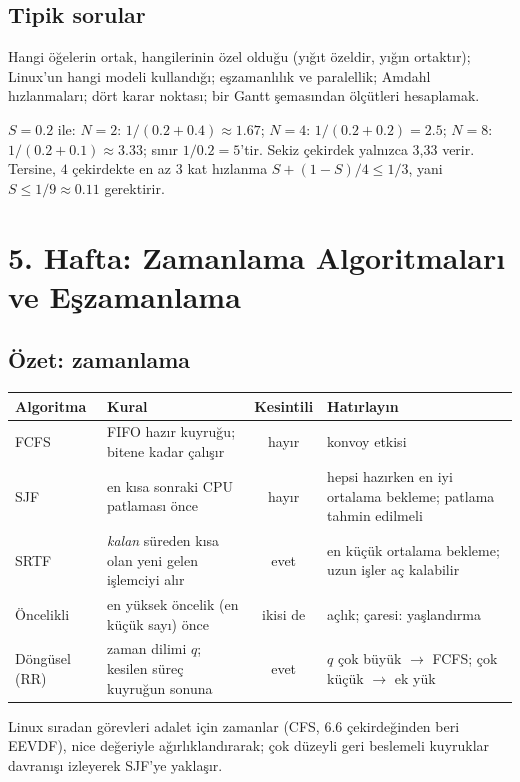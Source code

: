 \documentclass[11pt,a4paper]{article}
\begin{document}
\subsection*{Tipik sorular}
Hangi öğelerin ortak, hangilerinin özel olduğu (yığıt özeldir, yığın ortaktır); Linux'un hangi modeli kullandığı; eşzamanlılık ve paralellik; Amdahl hızlanmaları; dört karar noktası; bir Gantt şemasından ölçütleri hesaplamak.

\begin{example}
$S = 0.2$ ile: $N = 2$: $1/(0.2 + 0.4) \approx 1.67$; $N = 4$: $1/(0.2 + 0.2) = 2.5$; $N = 8$: $1/(0.2 + 0.1) \approx 3.33$; sınır $1/0.2 = 5$'tir. Sekiz çekirdek yalnızca 3,33 verir. Tersine, $4$ çekirdekte en az $3$ kat hızlanma $S + (1-S)/4 \le 1/3$, yani $S \le 1/9 \approx 0.11$ gerektirir.
\end{example}

\section{5. Hafta: Zamanlama Algoritmaları ve Eşzamanlama}
\label{sec:w5}
\subsection*{Özet: zamanlama}
\begin{center}
\renewcommand{\arraystretch}{1.25}
\begin{tabularx}{\linewidth}{@{}l >{\raggedright\arraybackslash}X c >{\raggedright\arraybackslash}X@{}}
\toprule
\textbf{Algoritma} & \textbf{Kural} & \textbf{Kesintili} & \textbf{Hatırlayın} \\
\midrule
FCFS & FIFO hazır kuyruğu; bitene kadar çalışır & hayır & konvoy etkisi \\
SJF & en kısa sonraki CPU patlaması önce & hayır & hepsi hazırken en iyi ortalama bekleme; patlama tahmin edilmeli \\
SRTF & \emph{kalan} süreden kısa olan yeni gelen işlemciyi alır & evet & en küçük ortalama bekleme; uzun işler aç kalabilir \\
Öncelikli & en yüksek öncelik (en küçük sayı) önce & ikisi de & açlık; çaresi: yaşlandırma \\
Döngüsel (RR) & zaman dilimi $q$; kesilen süreç kuyruğun sonuna & evet & $q$ çok büyük $\to$ FCFS; çok küçük $\to$ ek yük \\
\bottomrule
\end{tabularx}
\end{center}
Linux sıradan görevleri adalet için zamanlar (CFS, 6.6 çekirdeğinden beri EEVDF), nice değeriyle ağırlıklandırarak; çok düzeyli geri beslemeli kuyruklar davranışı izleyerek SJF'ye yaklaşır.
\end{document}
